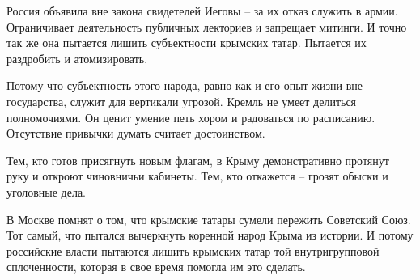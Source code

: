 Россия объявила вне закона свидетелей Иеговы – за их отказ служить в армии.
Ограничивает деятельность публичных лекториев и запрещает митинги. И точно так
же она пытается лишить субъектности крымских татар. Пытается их раздробить и
атомизировать. 

Потому что субъектность этого народа, равно как и его опыт жизни вне
государства, служит для вертикали угрозой. Кремль не умеет делиться
полномочиями. Он ценит умение петь хором и радоваться по расписанию. Отсутствие
привычки думать считает достоинством. 

Тем, кто готов присягнуть новым флагам, в Крыму демонстративно протянут руку и
откроют чиновничьи кабинеты. Тем, кто откажется – грозят обыски и уголовные
дела. 

В Москве помнят о том, что крымские татары сумели пережить Советский Союз. Тот
самый, что пытался вычеркнуть коренной народ Крыма из истории. И потому
российские власти пытаются лишить крымских татар той внутригрупповой
сплоченности, которая в свое время помогла им это сделать.
